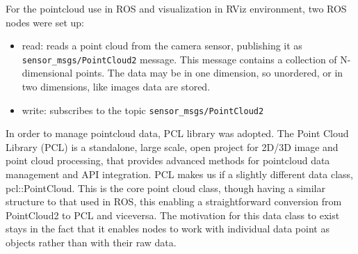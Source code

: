For the pointcloud use in ROS and visualization in RViz environment, two ROS nodes were set up: 
\begin{itemize}
    \item read: reads a point cloud from the camera sensor, publishing it as \texttt{sensor\_msgs/PointCloud2} message. This message contains a collection of N-dimensional points. The data may be in one dimension, so unordered, or in two dimensions, like images data are stored.
    \item write: subscribes to the topic \texttt{sensor\_msgs/PointCloud2} 
\end{itemize}

In order to manage pointcloud data, PCL library was adopted. The Point Cloud Library (PCL) is a standalone, large scale, open project for 2D/3D image and point cloud processing, that provides advanced methods for pointcloud data management and API integration. 
PCL makes us if a slightly different data class, pcl::PointCloud. This is the core point cloud class, though having a similar structure to that used in ROS, this enabling a straightforward conversion from PointCloud2 to PCL and viceversa. The motivation for this data class to exist stays in the fact that it enables nodes to work with individual data point as objects rather than with their raw data.
